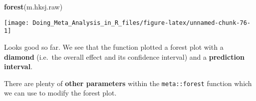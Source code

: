 \documentclass[]{book}
\newenvironment{Shaded}{\begin{snugshade}}{\end{snugshade}}
\newcommand{\KeywordTok}[1]{\textcolor[rgb]{0.13,0.29,0.53}{\textbf{#1}}}
\newcommand{\NormalTok}[1]{#1}
\theoremstyle{definition}
\theoremstyle{definition}
\theoremstyle{definition}
\theoremstyle{remark}
\begin{document}
\begin{Shaded}
\begin{Highlighting}[]
\KeywordTok{forest}\NormalTok{(m.hksj.raw)}
\end{Highlighting}
\end{Shaded}

\begin{center}\texttt{[image: Doing\_Meta\_Analysis\_in\_R\_files/figure-latex/unnamed-chunk-76-1]} \end{center}

Looks good so far. We see that the function plotted a forest plot with a
\textbf{diamond} (i.e.~the overall effect and its confidence interval)
and a \textbf{prediction interval}.

There are plenty of \textbf{other parameters} within the
\texttt{meta::forest} function which we can use to modify the forest
plot.
\end{document}
